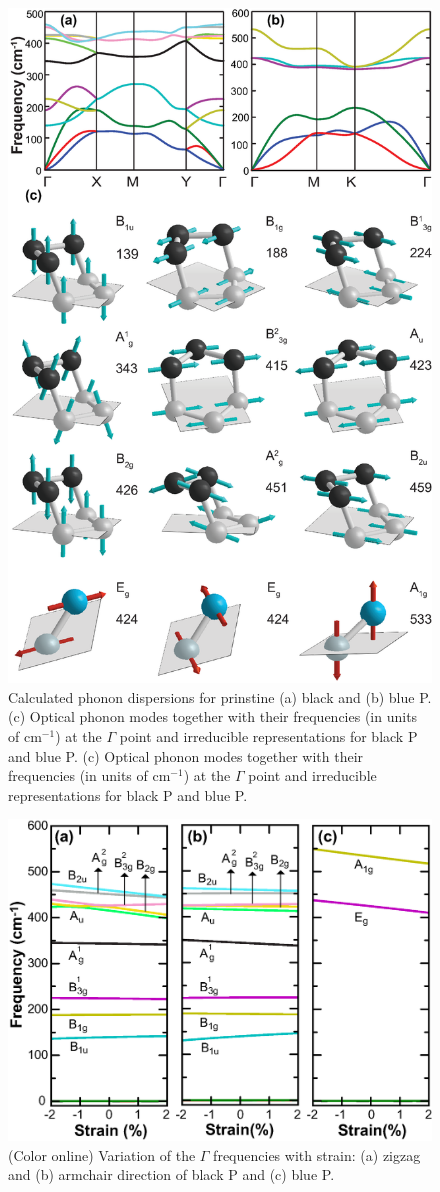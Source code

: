 \begin{figure}[htbp]
\centering
\includegraphics[width=0.8\linewidth]{phos_phon.eps}%
\caption{Calculated phonon dispersions for prinstine (a) black and (b) blue P. (c) Optical phonon modes together with their frequencies (in units of cm$^{-1}$) at the $\Gamma$ point and irreducible representations for black P and blue P. (c) Optical phonon modes together with their frequencies (in units of cm$^{-1}$) at the $\Gamma$ point and irreducible representations for black P and blue P.\label{fig:ire_phos}}
\end{figure}

\begin{figure}[htbp]
\centering
\includegraphics[width=0.8\linewidth]{strain_vib.eps}%
\caption{ (Color online) Variation of the $\Gamma$ frequencies with strain: (a) zigzag and (b) armchair direction of black P and (c) blue P.  \label{fig:shift_phos} }
\end{figure}

